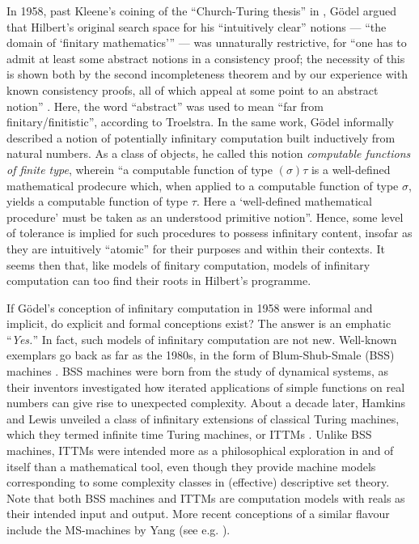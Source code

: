\documentclass[12pt, twoside]{memoir}
\numberwithin{equation}{section}
\theoremstyle{definition}
\theoremstyle{remark}
\theoremstyle{definition}
\theoremstyle{definition}
\theoremstyle{definition}
\theoremstyle{remark}
\begin{document}
In 1958, past Kleene's coining of the ``Church-Turing thesis'' in \cite{kleene}, G\"{o}del argued that Hilbert's original search space for his ``intuitively clear'' notions --- ``the domain of `finitary mathematics''' --- was unnaturally restrictive, for ``one has to admit at least some abstract notions in a consistency proof; the necessity of this is shown both by the second incompleteness theorem and by our experience with known consistency proofs, all of which appeal at some point to an abstract notion'' \cite{godelcw2}. Here, the word ``abstract'' was used to mean ``far from finitary/finitistic'', according to Troelstra. In the same work, G\"{o}del informally described a notion of potentially infinitary computation built inductively from natural numbers. As a class of objects, he called this notion \textit{computable functions of finite type}, wherein ``a computable function of type $(\sigma)\tau$ is a well-defined mathematical prodecure which, when applied to a computable function of type $\sigma$, yields a computable function of type $\tau$. Here a `well-defined mathematical procedure' must be taken as an understood primitive notion''. Hence, some level of tolerance is implied for such procedures to possess infinitary content, insofar as they are intuitively ``atomic'' for their purposes and within their contexts. It seems then that, like models of finitary computation, models of infinitary computation can too find their roots in Hilbert's programme.

If G\"{o}del's conception of infinitary computation in 1958 were informal and implicit, do explicit and formal conceptions exist? The answer is an emphatic ``\textit{Yes.}'' In fact, such models of infinitary computation are not new. Well-known exemplars go back as far as the 1980s, in the form of Blum-Shub-Smale (BSS) machines \cite{bss}. BSS machines were born from the study of dynamical systems, as their inventors investigated how iterated applications of simple functions on real numbers can give rise to unexpected complexity. About a decade later, Hamkins and Lewis unveiled a class of infinitary extensions of classical Turing machines, which they termed infinite time Turing machines, or ITTMs \cite{ittm}. Unlike BSS machines, ITTMs were intended more as a philosophical exploration in and of itself than a mathematical tool, even though they provide machine models corresponding to some complexity classes in (effective) descriptive set theory. Note that both BSS machines and ITTMs are computation models with reals as their intended input and output. More recent conceptions of a similar flavour include the MS-machines by Yang (see e.g. \cite{yangyue}).
\end{document}
